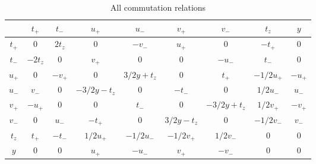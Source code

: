 \documentclass[a4paper,12pt]{article}
\begin{document}
\begin{table}[H]
	\centering
	\begin{tabular}{c||c|c|c|c|c|c|c|c}
		& $t_+$ & $t_-$ &	$u_+$ & $u_-$ & $v_+$ & $v_-$ & $t_z$ & $y$ \\
		\hline \hline
		 $t_+$ & 0 & $2t_z$ &  0  & $-v_-$ & $u_+$  & 0  & $-t_+$ & 0  \\
		\hline
		 $t_-$ & $-2t_z$ & $0$ &  $v_+$  & $0$ & $0$  & $-u_-$  & $t_-$ & 0  \\
		\hline
		 $u_+$ & $0$ & $-v_+$ &  $0$  & $3/2y+t_z$ & $0$  & $t_+$  & $-1/2 u_+$ & $-u_+$  \\
		\hline
		 $u_-$ & $v_-$ & $0$ &  $-3/2y-t_z$  & $0$ & $-t_-$  & $0$  & $1/2 u_-$ & $u_-$  \\
		\hline
		 $v_+$&  $-u_+$ & $0$ &  $0$  & $t_-$ & $0$  & $-3/2y+t_z$  & $1/2 v_+$ & $-v_+$  \\
		\hline
		 $v_-$& $0$ & $u_-$ &  $-t_+$  & $0$ & $3/2y-t_z$  & $0$  & $-1/2 v_-$ & $v_-$  \\
		\hline
		 $t_z$& $t_+$ & $-t_-$ &  $1/2u_+$  & $-1/2 u_-$ & $-1/2 v_+$  & $1/2v_-$  & $0$ & $0$  \\
		\hline
		 $y$ & $0$ & $0$ &  $u_+$  & $- u_-$ & $v_+$  & $-v_-$  & $0$ & $0$  \\
	\end{tabular}
	\caption{\label{tab:1} All commutation relations}
\end{table}
\end{document}
